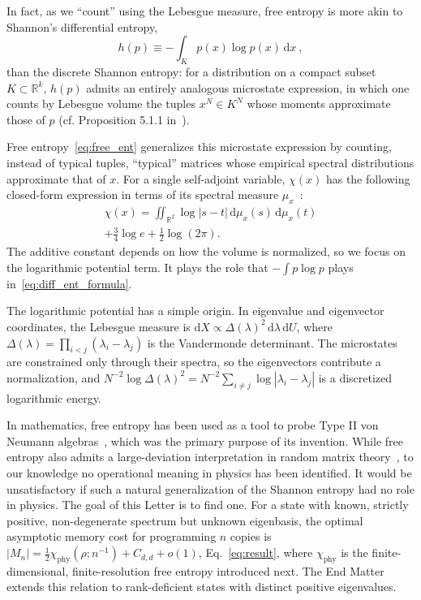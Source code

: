 \documentclass[aps,prl,twocolumn,superscriptaddress,amsmath,amssymb,reprint,longbibliography]{revtex4-2}
\newcommand{\dd}{\mathrm{d}}
\begin{document}
In fact, as we ``count'' using the Lebesgue measure, free entropy is more akin to Shannon's differential entropy,
\begin{equation}\label{eq:diff_ent_formula}
   h( p) \equiv - \int_K p( x)\log p( x)\,\dd x\ ,
\end{equation}
than the discrete Shannon entropy: for a distribution on a compact subset $K\subset\mathbb R^{k}$, $h(p)$ admits an entirely analogous microstate expression, in which one counts by Lebesgue volume the tuples $x^N\in K^N$ whose moments approximate those of $p$ (cf. Proposition 5.1.1 in~\cite{hiai2000semicircle}).

Free entropy~\eqref{eq:free_ent} generalizes this microstate expression by counting, instead of typical tuples, ``typical'' matrices whose empirical spectral distributions approximate that of $x$. For a single self-adjoint variable, $\chi(x)$ has the following closed-form expression in terms of its spectral measure $\mu_x$~\cite{voiculescu1994analogues,arous1997large,hiai2000semicircle}:
\begin{multline}\label{eq:free_ent_formula}
    \chi(x)=\iint_{\mathbb R^2}\log|s-t|\,\dd\mu_x(s)\,\dd\mu_x(t)\\
    +\frac34\log e+\frac12\log(2\pi).
\end{multline}
The additive constant depends on how the volume is normalized, so we focus on the logarithmic potential term. It plays the role that $-\int p\log p$ plays in~\eqref{eq:diff_ent_formula}.

The logarithmic potential has a simple origin. In eigenvalue and eigenvector coordinates, the Lebesgue measure is $\dd X\propto\Delta(\lambda)^2\,\dd\lambda\,\dd U$, where $\Delta(\lambda)=\prod_{i<j}(\lambda_i-\lambda_j)$ is the Vandermonde determinant. The microstates are constrained only through their spectra, so the eigenvectors contribute a normalization, and $N^{-2}\log\Delta(\lambda)^2=N^{-2}\sum_{i\ne j}\log|\lambda_i-\lambda_j|$ is a discretized logarithmic energy.

In mathematics, free entropy has been used as a tool to probe Type II von Neumann algebras~\cite{voiculescu1996analogues,voiculescu2002free,ge1997applications,ge1998applications}, which was the primary purpose of its invention. While free entropy also admits a large-deviation interpretation in random matrix theory~\cite{arous1997large}, to our knowledge no operational meaning in physics has been identified. It would be unsatisfactory if such a natural generalization of the Shannon entropy had no role in physics. The goal of this Letter is to find one. For a state with known, strictly positive, non-degenerate spectrum but unknown eigenbasis, the optimal asymptotic memory cost for programming $n$ copies is $|M_n|=\tfrac12\chi_{\mathrm{phy}}(\rho;n^{-1})+C_{d,d}+o(1)$, Eq.~\eqref{eq:result}, where $\chi_{\mathrm{phy}}$ is the finite-dimensional, finite-resolution free entropy introduced next. The End Matter extends this relation to rank-deficient states with distinct positive eigenvalues.
\end{document}
